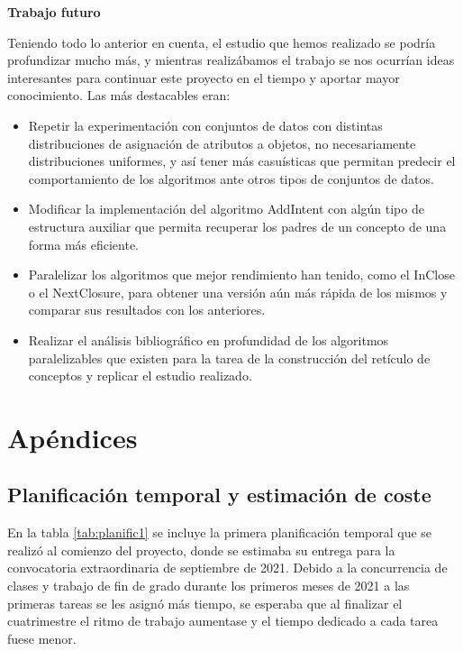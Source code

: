 \documentclass[oneside,openright,titlepage,numbers=noenddot,openany,headinclude,footinclude=true,
cleardoublepage=empty,abstractoff,BCOR=5mm,paper=a4,fontsize=12pt,main=spanish]{scrreprt}
\begin{document}
\textbf{Trabajo futuro}

Teniendo todo lo anterior en cuenta, el estudio que hemos realizado se podría profundizar mucho más, y mientras realizábamos el trabajo se nos ocurrían ideas interesantes para continuar este proyecto en el tiempo y aportar mayor conocimiento. Las más destacables eran:

\begin{itemize}
    \item Repetir la experimentación con conjuntos de datos con distintas distribuciones de asignación de atributos a objetos, no necesariamente distribuciones uniformes, y así tener más casuísticas que permitan predecir el comportamiento de los algoritmos ante otros tipos de conjuntos de datos.
    
    \item Modificar la implementación del algoritmo AddIntent con algún tipo de estructura auxiliar que permita recuperar los padres de un concepto de una forma más eficiente.
    
    \item Paralelizar los algoritmos que mejor rendimiento han tenido, como el InClose o el NextClosure, para obtener una versión aún más rápida de los mismos y comparar sus resultados con los anteriores.
    
    \item Realizar el análisis bibliográfico en profundidad de los algoritmos paralelizables que existen para la tarea de la construcción del retículo de conceptos y replicar el estudio realizado.
\end{itemize}







\appendix
\renewcommand{\thechapter}{\Alph{chapter}}
\ctparttext{
  \color{red}
  \begin{center}
    
  \end{center}
}
\part*{Apéndices}

\chapter{Planificación temporal y estimación de coste}
\label{apendicea}
En la tabla \ref{tab:planific1} se incluye la primera planificación temporal que se realizó al comienzo del proyecto, donde se estimaba su entrega para la convocatoria extraordinaria de septiembre de 2021. Debido a la concurrencia de clases y trabajo de fin de grado durante los primeros meses de 2021 a las primeras tareas se les asignó más tiempo, se esperaba que al finalizar el cuatrimestre el ritmo de trabajo aumentase y el tiempo dedicado a cada tarea fuese menor.
\end{document}
